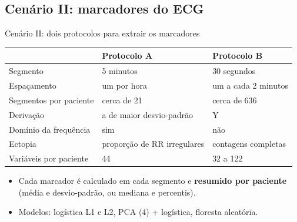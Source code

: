 \documentclass[10pt,aspectratio=169]{beamer}
\begin{document}
\subsection{Cenário II: marcadores do ECG}

\begin{frame}{Cenário II: dois protocolos para extrair os marcadores}
  \centering
  \footnotesize
  \begin{tabular}{lll}
    \toprule
    & Protocolo A & Protocolo B \\
    \midrule
    Segmento & 5 minutos & 30 segundos \\
    Espaçamento & um por hora & um a cada 2 minutos \\
    Segmentos por paciente & cerca de 21 & cerca de 636 \\
    Derivação & a de maior desvio-padrão & Y \\
    Domínio da frequência & sim & não \\
    Ectopia & proporção de RR irregulares & contagens completas \\
    Variáveis por paciente & 44 & 32 a 122 \\
    \bottomrule
  \end{tabular}
  \vspace{0.3cm}
  \begin{itemize}
    \small
    \item Cada marcador é calculado em cada segmento e \textbf{resumido por
      paciente} (média e desvio-padrão, ou mediana e percentis).
    \item Modelos: logística L1 e L2, PCA (4) + logística, floresta aleatória.
  \end{itemize}
\end{frame}
\end{document}
